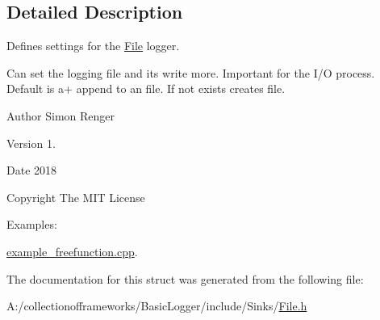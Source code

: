 \subsection{Detailed Description}
Defines settings for the \hyperlink{classcof_1_1basic__logger_1_1_file}{File} logger. 

Can set the logging file and its write more. Important for the I/O process. Default is {\ttfamily a+} append to an file. If not exists creates file.

\begin{DoxyAuthor}{Author}
Simon Renger 
\end{DoxyAuthor}
\begin{DoxyVersion}{Version}
1. 
\end{DoxyVersion}
\begin{DoxyDate}{Date}
2018 
\end{DoxyDate}
\begin{DoxyCopyright}{Copyright}
The M\+IT License 
\end{DoxyCopyright}
\begin{Desc}
\item[Examples\+: ]\par
\hyperlink{example_freefunction_8cpp-example}{example\+\_\+freefunction.\+cpp}.\end{Desc}


The documentation for this struct was generated from the following file\+:\begin{DoxyCompactItemize}
\item 
A\+:/collectionofframeworks/\+Basic\+Logger/include/\+Sinks/\hyperlink{_file_8h}{File.\+h}\end{DoxyCompactItemize}
